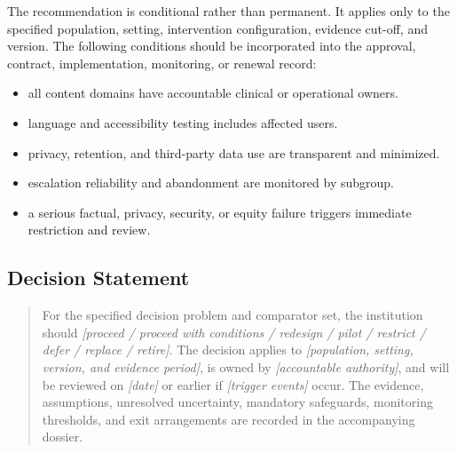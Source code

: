 The recommendation is conditional rather than permanent. It applies only to the
specified population, setting, intervention configuration, evidence cut-off, and
version. The following conditions should be incorporated into the approval,
contract, implementation, monitoring, or renewal record:

\begin{itemize}
 \item all content domains have accountable clinical or operational owners.
 \item language and accessibility testing includes affected users.
 \item privacy, retention, and third-party data use are transparent and minimized.
 \item escalation reliability and abandonment are monitored by subgroup.
 \item a serious factual, privacy, security, or equity failure triggers immediate restriction and review.
\end{itemize}

\subsection{Decision Statement}
\begin{quote}
For the specified decision problem and comparator set, the institution should
\emph{[proceed / proceed with conditions / redesign / pilot / restrict / defer /
replace / retire]}. The decision applies to \emph{[population, setting, version,
and evidence period]}, is owned by \emph{[accountable authority]}, and will be
reviewed on \emph{[date]} or earlier if \emph{[trigger events]} occur. The
evidence, assumptions, unresolved uncertainty, mandatory safeguards, monitoring
thresholds, and exit arrangements are recorded in the accompanying dossier.
\end{quote}
